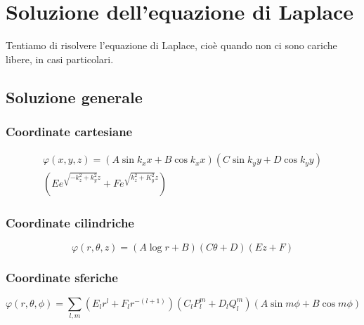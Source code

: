\section{Soluzione dell'equazione di Laplace}
Tentiamo di risolvere l'equazione di Laplace, cioè quando non ci sono cariche libere, in casi particolari.
\subsection{Soluzione generale}
\subsubsection{Coordinate cartesiane}
\begin{multline}
\varphi(x,y,z)=\left(A\sin k_x x+B\cos k_x x\right)\left(C\sin k_y y+D\cos k_y y\right)\\\left(Ee^{\sqrt{-k_z^2+k_y^2}z}+Fe^{\sqrt{k_z^2+K_y^2}z}\right)
\end{multline}
\subsubsection{Coordinate cilindriche}
\begin{equation}
\varphi(r,\theta,z)=\left(A\log r+B\right)\left(C\theta+D\right)\left(Ez+F\right)
\end{equation}
\subsubsection{Coordinate sferiche}
\begin{equation}
\varphi(r,\theta,\phi)=\sum_{l,m}\left(E_lr^l+F_lr^{-(l+1)}\right)\left(C_lP_l^m+D_lQ_l^m\right)\left(A\sin m\phi+B\cos m\phi\right)
\end{equation}
